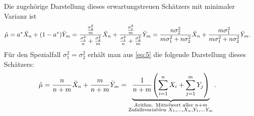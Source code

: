 \documentclass{exercise}
\begin{document}
\begin{enumerate}
        Die zugehörige Darstellung dieses erwartungstreuen Schätzers mit minimaler Varianz ist
        \begin{equation}\label{eq:5}
            \hat{\mu} = a^* \bar{X}_n + \parentheses*{1 - a^*}\bar{Y}_m = \frac{\frac{\sigma_2^2}{m}}{\frac{\sigma_1^2}{n} + \frac{\sigma_2^2}{m}}\bar{X}_n + \frac{\frac{\sigma_1^2}{m}}{\frac{\sigma_1^2}{n} + \frac{\sigma_2^2}{m}}\bar{Y}_m = \frac{n\sigma_2^2}{m\sigma_1^2 + n\sigma_2^2}\bar{X}_n + \frac{m\sigma_1^2}{m\sigma_1^2 + n\sigma_2^2}\bar{Y}_m.
        \end{equation}
        Für den Spezialfall \(\sigma_1^2 = \sigma_2^2\) erhält man aus \eqref{eq:5} die folgende Darstellung dieses Schätzers:
        \[
            \hat{\mu} = \frac{n}{n + m}\bar{X}_n + \frac{m}{n + m}\bar{Y}_m = \underbrace{\frac{1}{n + m}\parentheses*{\sum_{i = 1}^n X_i + \sum_{j = 1}^m Y_j}}_{\substack{\text{Arithm. Mittelwert aller }n + m\\\text{Zufallsvariablen }X_1, \ldots, X_n, Y_1, \ldots Y_m}}.
        \]
    \end{enumerate}
\end{document}
